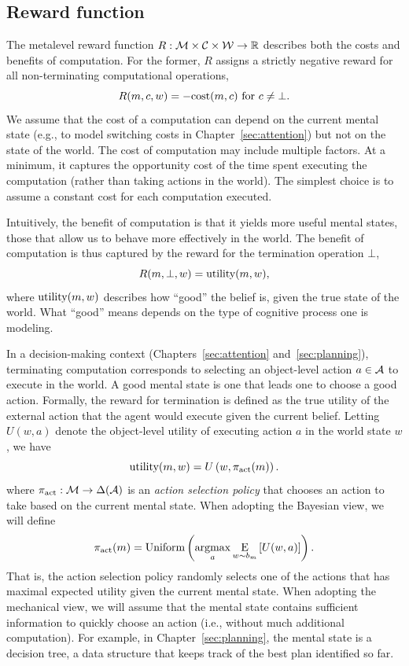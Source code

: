 \subsection{Reward function}
The metalevel reward function $R: \M \times \C \times \W \rightarrow \R$ describes both the costs and benefits of computation. For the former, $R$ assigns a strictly negative reward for all non-terminating computational operations,
%
\begin{equation}
R(m, c, w) = -\cost(m, c) \text{ for } c \neq \bot.
\end{equation}
%
We assume that the cost of a computation can depend on the current mental state (e.g., to model switching costs in Chapter~\ref{sec:attention}) but not on the state of the world. The cost of computation may include multiple factors. At a minimum, it captures the opportunity cost of the time spent executing the computation (rather than taking actions in the world). The simplest choice is to assume a constant cost for each computation executed.

Intuitively, the benefit of computation is that it yields more useful mental states, those that allow us to behave more effectively in the world. The benefit of computation is thus captured by the reward for the termination operation $\bot$,
%
\begin{equation}
  R(m, \bot, w) = \utility(m, w),
\end{equation}
%
where $\utility(m, w)$ describes how ``good'' the belief is, given the true state of the world. What ``good'' means depends on the type of cognitive process one is modeling. 

In a decision-making context (Chapters~\ref{sec:attention} and~\ref{sec:planning}), terminating computation corresponds to selecting an object-level action $a \in \A$ to execute in the world. A good mental state is one that leads one to choose a good action. Formally, the reward for termination is defined as the true utility of the external action that the agent would execute given the current belief. Letting $U(w, a)$ denote the object-level utility of executing action $a$ in the world state $w$, we have
%
\begin{equation}\label{eq:term-reward}
\utility(m, w) = U\left(w, \pi\act(m)\right).
\end{equation}
%
where $\pi\act: \M \rightarrow \Delta(\A)$ is an \emph{action selection policy} that chooses an action to take based on the current mental state. When adopting the Bayesian view, we will define
\begin{equation}
  \pi\act(m) = \text{Uniform} \left(\argmax_a \expectunder{U(w, a)}{w \sim b_m}\right).
\end{equation}
%
That is, the action selection policy randomly selects one of the actions that has maximal expected utility given the current mental state. When adopting the mechanical view, we will assume that the mental state contains sufficient information to quickly choose an action (i.e., without much additional computation). For example, in Chapter~\ref{sec:planning}, the mental state is a decision tree, a data structure that keeps track of the best plan identified so far.

